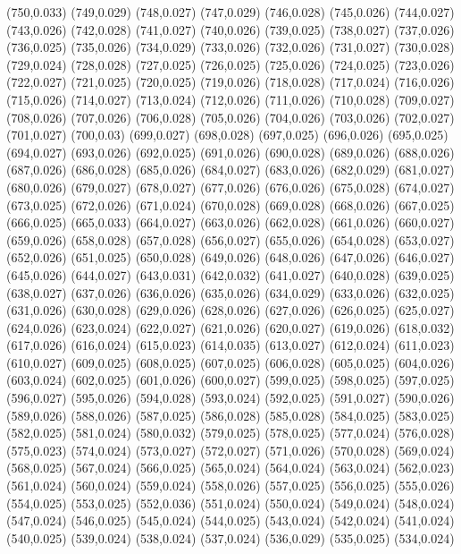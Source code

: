 (750,0.033)
(749,0.029)
(748,0.027)
(747,0.029)
(746,0.028)
(745,0.026)
(744,0.027)
(743,0.026)
(742,0.028)
(741,0.027)
(740,0.026)
(739,0.025)
(738,0.027)
(737,0.026)
(736,0.025)
(735,0.026)
(734,0.029)
(733,0.026)
(732,0.026)
(731,0.027)
(730,0.028)
(729,0.024)
(728,0.028)
(727,0.025)
(726,0.025)
(725,0.026)
(724,0.025)
(723,0.026)
(722,0.027)
(721,0.025)
(720,0.025)
(719,0.026)
(718,0.028)
(717,0.024)
(716,0.026)
(715,0.026)
(714,0.027)
(713,0.024)
(712,0.026)
(711,0.026)
(710,0.028)
(709,0.027)
(708,0.026)
(707,0.026)
(706,0.028)
(705,0.026)
(704,0.026)
(703,0.026)
(702,0.027)
(701,0.027)
(700,0.03)
(699,0.027)
(698,0.028)
(697,0.025)
(696,0.026)
(695,0.025)
(694,0.027)
(693,0.026)
(692,0.025)
(691,0.026)
(690,0.028)
(689,0.026)
(688,0.026)
(687,0.026)
(686,0.028)
(685,0.026)
(684,0.027)
(683,0.026)
(682,0.029)
(681,0.027)
(680,0.026)
(679,0.027)
(678,0.027)
(677,0.026)
(676,0.026)
(675,0.028)
(674,0.027)
(673,0.025)
(672,0.026)
(671,0.024)
(670,0.028)
(669,0.028)
(668,0.026)
(667,0.025)
(666,0.025)
(665,0.033)
(664,0.027)
(663,0.026)
(662,0.028)
(661,0.026)
(660,0.027)
(659,0.026)
(658,0.028)
(657,0.028)
(656,0.027)
(655,0.026)
(654,0.028)
(653,0.027)
(652,0.026)
(651,0.025)
(650,0.028)
(649,0.026)
(648,0.026)
(647,0.026)
(646,0.027)
(645,0.026)
(644,0.027)
(643,0.031)
(642,0.032)
(641,0.027)
(640,0.028)
(639,0.025)
(638,0.027)
(637,0.026)
(636,0.026)
(635,0.026)
(634,0.029)
(633,0.026)
(632,0.025)
(631,0.026)
(630,0.028)
(629,0.026)
(628,0.026)
(627,0.026)
(626,0.025)
(625,0.027)
(624,0.026)
(623,0.024)
(622,0.027)
(621,0.026)
(620,0.027)
(619,0.026)
(618,0.032)
(617,0.026)
(616,0.024)
(615,0.023)
(614,0.035)
(613,0.027)
(612,0.024)
(611,0.023)
(610,0.027)
(609,0.025)
(608,0.025)
(607,0.025)
(606,0.028)
(605,0.025)
(604,0.026)
(603,0.024)
(602,0.025)
(601,0.026)
(600,0.027)
(599,0.025)
(598,0.025)
(597,0.025)
(596,0.027)
(595,0.026)
(594,0.028)
(593,0.024)
(592,0.025)
(591,0.027)
(590,0.026)
(589,0.026)
(588,0.026)
(587,0.025)
(586,0.028)
(585,0.028)
(584,0.025)
(583,0.025)
(582,0.025)
(581,0.024)
(580,0.032)
(579,0.025)
(578,0.025)
(577,0.024)
(576,0.028)
(575,0.023)
(574,0.024)
(573,0.027)
(572,0.027)
(571,0.026)
(570,0.028)
(569,0.024)
(568,0.025)
(567,0.024)
(566,0.025)
(565,0.024)
(564,0.024)
(563,0.024)
(562,0.023)
(561,0.024)
(560,0.024)
(559,0.024)
(558,0.026)
(557,0.025)
(556,0.025)
(555,0.026)
(554,0.025)
(553,0.025)
(552,0.036)
(551,0.024)
(550,0.024)
(549,0.024)
(548,0.024)
(547,0.024)
(546,0.025)
(545,0.024)
(544,0.025)
(543,0.024)
(542,0.024)
(541,0.024)
(540,0.025)
(539,0.024)
(538,0.024)
(537,0.024)
(536,0.029)
(535,0.025)
(534,0.024)
